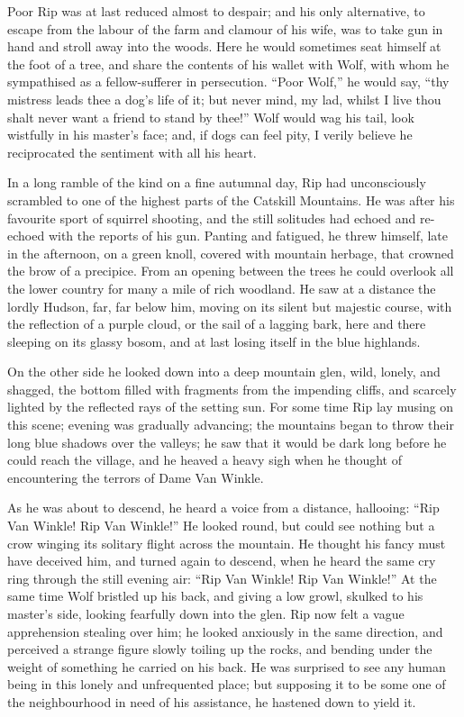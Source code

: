 Poor Rip was at last reduced almost to despair; and his only alternative, to escape from the labour of the farm and clamour of his wife, was to take gun in hand and stroll away into the woods. Here he would sometimes seat himself at the foot of a tree, and share the contents of his wallet with Wolf, with whom he sympathised as a fellow-sufferer in persecution. “Poor Wolf,” he would say, “thy mistress leads thee a dog’s life of it; but never mind, my lad, whilst I live thou shalt never want a friend to stand by thee!” Wolf would wag his tail, look wistfully in his master’s face; and, if dogs can feel pity, I verily believe he reciprocated the sentiment with all his heart.

In a long ramble of the kind on a fine autumnal day, Rip had unconsciously scrambled to one of the highest parts of the Catskill Mountains. He was after his favourite sport of squirrel shooting, and the still solitudes had echoed and re-echoed with the reports of his gun. Panting and fatigued, he threw himself, late in the afternoon, on a green knoll, covered with mountain herbage, that crowned the brow of a precipice. From an opening between the trees he could overlook all the lower country for many a mile of rich woodland. He saw at a distance the lordly Hudson, far, far below him, moving on its silent but majestic course, with the reflection of a purple cloud, or the sail of a lagging bark, here and there sleeping on its glassy bosom, and at last losing itself in the blue highlands.

On the other side he looked down into a deep mountain glen, wild, lonely, and shagged, the bottom filled with fragments from the impending cliffs, and scarcely lighted by the reflected rays of the setting sun. For some time Rip lay musing on this scene; evening was gradually advancing; the mountains began to throw their long blue shadows over the valleys; he saw that it would be dark long before he could reach the village, and he heaved a heavy sigh when he thought of encountering the terrors of Dame Van Winkle.

As he was about to descend, he heard a voice from a distance, hallooing: “Rip Van Winkle! Rip Van Winkle!” He looked round, but could see nothing but a crow winging its solitary flight across the mountain. He thought his fancy must have deceived him, and turned again to descend, when he heard the same cry ring through the still evening air: “Rip Van Winkle! Rip Van Winkle!” At the same time Wolf bristled up his back, and giving a low growl, skulked to his master’s side, looking fearfully down into the glen. Rip now felt a vague apprehension stealing over him; he looked anxiously in the same direction, and perceived a strange figure slowly toiling up the rocks, and bending under the weight of something he carried on his back. He was surprised to see any human being in this lonely and unfrequented place; but supposing it to be some one of the neighbourhood in need of his assistance, he hastened down to yield it.

